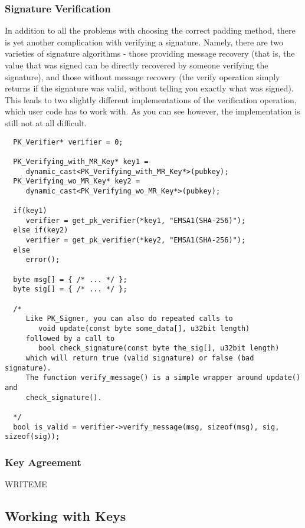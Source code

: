 \documentclass{article}
\begin{document}
\pagebreak

\subsubsection{Signature Verification}

In addition to all the problems with choosing the correct padding method,
there is yet another complication with verifying a signature. Namely, there are
two varieties of signature algorithms - those providing message recovery (that
is, the value that was signed can be directly recovered by someone verifying
the signature), and those without message recovery (the verify operation simply
returns if the signature was valid, without telling you exactly what was
signed). This leads to two slightly different implementations of the
verification operation, which user code has to work with. As you can see
however, the implementation is still not at all difficult.

\begin{verbatim}
  PK_Verifier* verifier = 0;

  PK_Verifying_with_MR_Key* key1 =
     dynamic_cast<PK_Verifying_with_MR_Key*>(pubkey);
  PK_Verifying_wo_MR_Key* key2 =
     dynamic_cast<PK_Verifying_wo_MR_Key*>(pubkey);

  if(key1)
     verifier = get_pk_verifier(*key1, "EMSA1(SHA-256)");
  else if(key2)
     verifier = get_pk_verifier(*key2, "EMSA1(SHA-256)");
  else
     error();

  byte msg[] = { /* ... */ };
  byte sig[] = { /* ... */ };

  /*
     Like PK_Signer, you can also do repeated calls to
        void update(const byte some_data[], u32bit length)
     followed by a call to
        bool check_signature(const byte the_sig[], u32bit length)
     which will return true (valid signature) or false (bad signature).
     The function verify_message() is a simple wrapper around update() and
     check_signature().

  */
  bool is_valid = verifier->verify_message(msg, sizeof(msg), sig, sizeof(sig));
\end{verbatim}

\subsubsection{Key Agreement}

WRITEME

\pagebreak

\subsection{Working with Keys}
\end{document}
